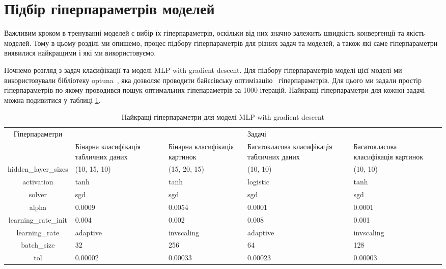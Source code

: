 \section{Підбір гіперпараметрів моделей}

Важливим кроком в тренуванні моделей є вибір їх гіперпараметрів, оскільки від них значно залежить швидкість конвергенції та якість моделей. Тому в цьому розділі ми опишемо, процес підбору гіперпараметрів для різних задач та моделей, а також які саме гіперпараметри виявилися найкращими і які ми використовуємо.

Почнемо розгляд з задач класифікації та моделі MLP with gradient descent. Для підбору гіперпараметрів моделі цієї моделі ми використовували бібліотеку optuna~\cite{ct22}, яка дозволяє проводити байєсівську оптимізацію~\cite{ct37} гіперпараметрів. Для цього ми задали простір гіперпараметрів по якому проводився пошук оптимальних гіпепараметрів за 1000 ітерацій. Найкращі гіперпараметри для кожної задачі можна подивитися у таблиці \ref{tab_hyperparameters_for_mlp_with_gd}.

\begin{table}[ht]
	\caption{Найкращі гіперпараметри для моделі MLP with gradient descent}
	\label{tab_hyperparameters_for_mlp_with_gd}
	\centering
	\begin{adjustbox}{max width=\textwidth}
		\begin{tabular}{|c|p{3cm}|p{3cm}|p{3cm}|p{3cm}|}
			\hline \multirow{2}{*}{Гіперпараметри} & \multicolumn{4}{c|}{Задачі} \\
			\cline{2-5} & Бінарна класифікація табличних даних & Бінарна класифікація картинок & Багатокласова класифікація табличних даних & Багатокласова класифікація картинок \\
			\hline hidden\_layer\_sizes & (10, 15, 10) & (15, 20, 15) & (10, 10) & (10, 10) \\
			\hline activation & tanh & tanh & logistic & tanh \\
			\hline solver & sgd & sgd & sgd & sgd \\
			\hline alpha & 0.0009 & 0.0054 & 0.0001 & 0.0001 \\
			\hline learning\_rate\_init & 0.004 & 0.002 & 0.008 & 0.001 \\
			\hline learning\_rate & adaptive & invscaling & adaptive & invscaling \\
			\hline batch\_size & 32 & 256 & 64 & 128 \\
			\hline tol & 0.00002 & 0.00033 & 0.00023 & 0.00003 \\
			\hline
		\end{tabular}
	\end{adjustbox}
\end{table}

